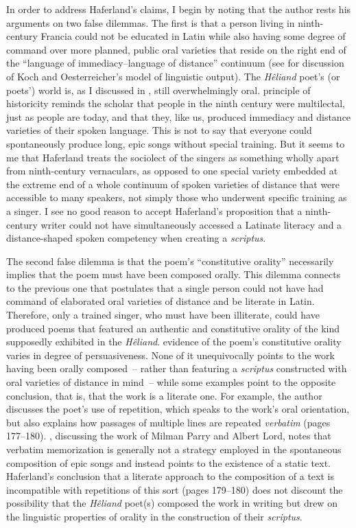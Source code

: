 In order to address Haferland’s claims, I begin by noting that the author rests his arguments on two false dilemmas. The first is that a person living in ninth-century Francia could not be educated in Latin while also having some degree of command over more planned, public oral varieties that reside on the right end of the “language of immediacy–language of distance” continuum (see  for discussion of Koch and Oesterreicher’s model of linguistic output). The \textit{Hêliand} poet’s (or poets’) world is, as I discussed in , still overwhelmingly oral.  principle of historicity reminds the scholar that people in the ninth century were multilectal, just as people are today, and that they, like us, produced immediacy and distance varieties of their spoken language. This is not to say that everyone could spontaneously produce long, epic songs without special training. But it seems to me that Haferland treats the sociolect of the singers as something wholly apart from ninth-century vernaculars, as opposed to one special variety embedded at the extreme end of a whole continuum of spoken varieties of distance that were accessible to many speakers, not simply those who underwent specific training as a singer. I see no good reason to accept Haferland’s proposition that a ninth-century writer could not have simultaneously accessed a Latinate literacy and a distance-shaped spoken competency when creating a \textit{scriptus}.

The second false dilemma is that the poem’s “constitutive orality” necessarily implies that the poem must have been composed orally. This dilemma connects to the previous one that postulates that a single person could not have had command of elaborated oral varieties of distance and be literate in Latin. Therefore, only a trained singer, who must have been illiterate, could have produced poems that featured an authentic and constitutive orality of the kind supposedly exhibited in the \textit{Hêliand}.  evidence of the poem’s constitutive orality varies in degree of persuasiveness. None of it unequivocally points to the work having been orally composed~-- rather than featuring a \textit{scriptus} constructed with oral varieties of distance in mind~-- while some examples point to the opposite conclusion, that is, that the work is a literate one. For example, the author discusses the poet’s use of repetition, which speaks to the work’s oral orientation, but also explains how passages of multiple lines are repeated \textit{verbatim} (pages 177--180). \citet[57--65]{Ong2012}, discussing the work of Milman Parry and Albert Lord, notes that verbatim memorization is generally not a strategy employed in the spontaneous composition of epic songs and instead points to the existence of a static text. Haferland’s conclusion that a literate approach to the composition of a text is incompatible with repetitions of this sort (pages 179--180) does not discount the possibility that the \textit{Hêliand} poet(s) composed the work in writing but drew on the linguistic properties of orality in the construction of their \textit{scriptus}.

